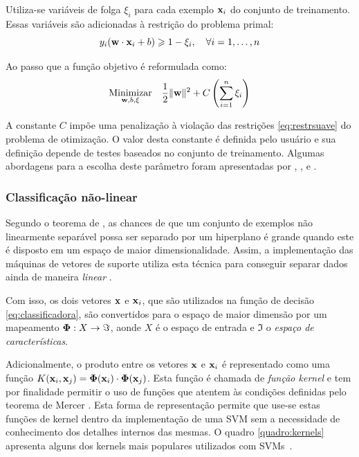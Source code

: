 Utiliza-se variáveis de folga $\xi_i$ para cada exemplo $\mathbf{x}_i$ do conjunto de treinamento. Essas variáveis são adicionadas à restrição do problema primal:
\begin{equation}\label{eq:restrsuave}
  y_i(\mathbf{w}\cdot\mathbf{x}_i+b) \geqslant 1 - \xi_i,\quad\forall{i}=1,\dotsc,n
\end{equation}

Ao passo que a função objetivo é reformulada como:
\begin{equation}
  \underset{\mathbf{w}, b, \mathbf{\xi}}{\operatorname{Minimizar}}\quad
         \frac{1}{2}\lVert \mathbf{w} \rVert^2+C\left(\sum_{i=1}^n{\xi_i}\right)
\end{equation}

A constante $C$ impõe uma penalização à violação das restrições \ref{eq:restrsuave} do problema de otimização. O valor desta constante é definida pelo usuário e sua definição depende de testes baseados no conjunto de treinamento. Algumas abordagens para a escolha deste parâmetro foram apresentadas por , ,  e \cite{ben2010user}.


\subsubsection{Classificação não-linear}\label{sec:naolinear}

Segundo o teorema de , as chances de que um conjunto de exemplos não linearmente separável possa ser separado por um hiperplano é grande quando este é disposto em um espaço de maior dimensionalidade. Assim, a implementação das máquinas de vetores de suporte utiliza esta técnica para conseguir separar dados ainda de maneira \emph{linear} \cite{burges1998tutorial}.

Com isso, os dois vetores $\mathbf{x}$ e $\mathbf{x}_i$, que são utilizados na função de decisão \ref{eq:classificadora}, são convertidos para o espaço de maior dimensão por um mapeamento $\mathbf{\Phi}: X \rightarrow \Im$, aonde $X$ é o espaço de entrada e $\Im$ o \emph{espaço de características}.

Adicionalmente, o produto entre os vetores $\mathbf{x}$ e $\mathbf{x}_i$ é representado como uma função $K(\mathbf{x}_i, \mathbf{x}_j) = \mathbf{\Phi}(\mathbf{x}_i)\cdot\mathbf{\Phi}(\mathbf{x}_j)$. Esta função é chamada de \emph{função kernel} e tem por finalidade permitir o uso de funções que atentem às condições definidas pelo teorema de Mercer \cite[p. 141]{burges1998tutorial}. Esta forma de representação permite que use-se estas funções de kernel dentro da implementação de uma SVM sem a necessidade de conhecimento dos detalhes internos das mesmas. O quadro \ref{quadro:kernels} apresenta alguns dos kernels mais populares utilizados com SVMs~\cite{lorena2003introducaoas}.

